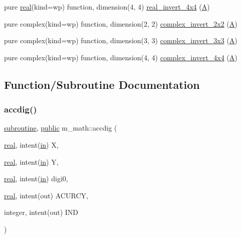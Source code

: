 \begin{DoxyCompactItemize}
pure \hyperlink{read__watch_83_8txt_abdb62bde002f38ef75f810d3a905a823}{real}(kind=wp) function, dimension(4, 4) \hyperlink{namespacem__math_a09e9433fe80e44fc0b63d815d2ee389a}{real\+\_\+invert\+\_\+4x4} (\hyperlink{ufpp__overview_81_8txt_a8341271e5f4e3003f6eb1c9547fc9d1a}{A})
\item 
pure complex(kind=wp) function, dimension(2, 2) \hyperlink{namespacem__math_ae91471830acbe021ac273b72331bafd2}{complex\+\_\+invert\+\_\+2x2} (\hyperlink{ufpp__overview_81_8txt_a8341271e5f4e3003f6eb1c9547fc9d1a}{A})
\item 
pure complex(kind=wp) function, dimension(3, 3) \hyperlink{namespacem__math_a09c8d8435741d02fc85dce5435a5630d}{complex\+\_\+invert\+\_\+3x3} (\hyperlink{ufpp__overview_81_8txt_a8341271e5f4e3003f6eb1c9547fc9d1a}{A})
\item 
pure complex(kind=wp) function, dimension(4, 4) \hyperlink{namespacem__math_a8e3ef557757711b8ace73f51e44659a6}{complex\+\_\+invert\+\_\+4x4} (\hyperlink{ufpp__overview_81_8txt_a8341271e5f4e3003f6eb1c9547fc9d1a}{A})
\end{DoxyCompactItemize}


\subsection{Function/\+Subroutine Documentation}
\mbox{\label{namespacem__math_a29d92d203eee5fb3ccf5fee7abce7450}} 
\subsubsection{\texorpdfstring{accdig()}{accdig()}}
{\footnotesize\ttfamily \hyperlink{M__stopwatch_83_8txt_acfbcff50169d691ff02d4a123ed70482}{subroutine}, \hyperlink{M__stopwatch_83_8txt_a2f74811300c361e53b430611a7d1769f}{public} m\+\_\+math\+::accdig (\begin{DoxyParamCaption}\item[{\hyperlink{read__watch_83_8txt_abdb62bde002f38ef75f810d3a905a823}{real}, intent(\hyperlink{M__journal_83_8txt_afce72651d1eed785a2132bee863b2f38}{in})}]{X,  }\item[{\hyperlink{read__watch_83_8txt_abdb62bde002f38ef75f810d3a905a823}{real}, intent(\hyperlink{M__journal_83_8txt_afce72651d1eed785a2132bee863b2f38}{in})}]{Y,  }\item[{\hyperlink{read__watch_83_8txt_abdb62bde002f38ef75f810d3a905a823}{real}, intent(\hyperlink{M__journal_83_8txt_afce72651d1eed785a2132bee863b2f38}{in})}]{digi0,  }\item[{\hyperlink{read__watch_83_8txt_abdb62bde002f38ef75f810d3a905a823}{real}, intent(out)}]{A\+C\+U\+R\+CY,  }\item[{integer, intent(out)}]{I\+ND }\end{DoxyParamCaption})}



